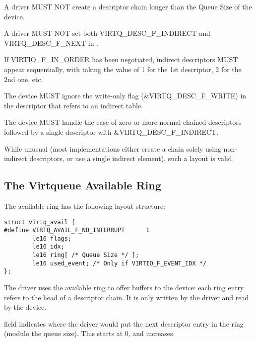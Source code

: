 A driver MUST NOT create a descriptor chain longer than the Queue Size of
the device.

A driver MUST NOT set both VIRTQ_DESC_F_INDIRECT and VIRTQ_DESC_F_NEXT
in .

If VIRTIO_F_IN_ORDER has been negotiated, indirect descriptors
MUST appear sequentially, with  taking the value
of 1 for the 1st descriptor, 2 for the 2nd one, etc.

The device MUST ignore the write-only flag (\&VIRTQ_DESC_F_WRITE) in the descriptor that refers to an indirect table.

The device MUST handle the case of zero or more normal chained
descriptors followed by a single descriptor with \&VIRTQ_DESC_F_INDIRECT.

\begin{note}
While unusual (most implementations either create a chain solely using
non-indirect descriptors, or use a single indirect element), such a
layout is valid.
\end{note}

\subsection{The Virtqueue Available Ring}\label{sec:Basic Facilities of a Virtio Device / Virtqueues / The Virtqueue Available Ring}

The available ring has the following layout structure:

\begin{lstlisting}
struct virtq_avail {
#define VIRTQ_AVAIL_F_NO_INTERRUPT      1
        le16 flags;
        le16 idx;
        le16 ring[ /* Queue Size */ ];
        le16 used_event; /* Only if VIRTIO_F_EVENT_IDX */
};
\end{lstlisting}

The driver uses the available ring to offer buffers to the
device: each ring entry refers to the head of a descriptor chain.  It is only
written by the driver and read by the device.

 field indicates where the driver would put the next descriptor
entry in the ring (modulo the queue size). This starts at 0, and increases.


